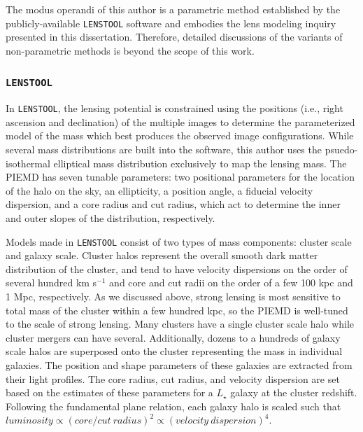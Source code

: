 The modus operandi of this author is a parametric method established by the publicly-available \texttt{LENSTOOL} software \citep{Jullo:2007lr} and embodies the lens modeling inquiry presented in this dissertation. Therefore, detailed discussions of the variants of non-parametric methods is beyond the scope of this work. 

\subsubsection{\texttt{LENSTOOL}}

In \texttt{LENSTOOL}, the lensing potential is constrained using the positions (i.e., right ascension and declination) of the multiple images to determine the parameterized model of the mass which best produces the observed image configurations. While several mass distributions are built into the software, this author uses the psuedo-isothermal elliptical mass distribution \citep[PIEMD; ][]{Eliasdottir:2007ve} exclusively to map the lensing mass. The PIEMD has seven tunable parameters: two positional parameters for the location of the halo on the sky, an ellipticity, a position angle, a fiducial velocity dispersion, and a core radius and cut radius, which act to determine the inner and outer slopes of the distribution, respectively.

Models made in \texttt{LENSTOOL} consist of two types of mass components: cluster scale and galaxy scale. Cluster halos represent the overall smooth dark matter distribution of the cluster, and tend to have velocity dispersions on the order of several hundred km s$^{-1}$ and core and cut radii on the order of a few 100 kpc and 1 Mpc, respectively. As we discussed above, strong lensing is most sensitive to total mass of the cluster within a few hundred kpc, so the PIEMD is well-tuned to the scale of strong lensing. Many clusters have a single cluster scale halo while cluster mergers can have several. Additionally, dozens to a hundreds of galaxy scale halos are superposed onto the cluster representing the mass in individual galaxies. The position and shape parameters of these galaxies are extracted from their light profiles. The core radius, cut radius, and velocity dispersion are set based on the estimates of these parameters for a $L_\star$ galaxy at the cluster redshift. Following the fundamental plane relation, each galaxy halo is scaled such that $luminosity \propto (core/cut\ radius)^2 \propto (velocity\ dispersion)^4$.

